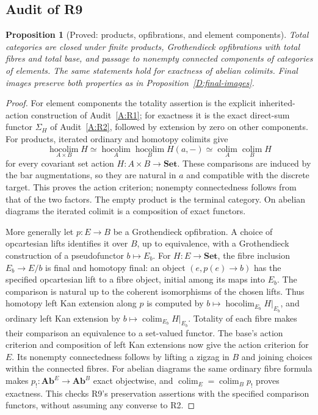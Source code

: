 \documentclass[11pt,a4paper]{article}
\newcommand{\Set}{\mathbf{Set}}
\newcommand{\Ab}{\mathbf{Ab}}
\newcommand{\colim}{\operatorname*{colim}}
\newcommand{\hocolim}{\operatorname*{hocolim}}
\newtheorem{proposition}[theorem]{Proposition}
\theoremstyle{definition}
\begin{document}
\subsection{Audit of R9}
\begin{proposition}[Proved: products, opfibrations, and element components]\label{D:R9}
Total categories are closed under finite products, Grothendieck opfibrations with total fibres and total base, and passage to nonempty connected components of categories of elements. The same statements hold for exactness of abelian colimits. Final images preserve both properties as in Proposition~\ref{D:final-images}.
\end{proposition}
\begin{proof}
For element components the totality assertion is the explicit inherited-action construction of Audit~\ref{A:R1}; for exactness it is the exact direct-sum functor $\Sigma_H$ of Audit~\ref{A:R2}, followed by extension by zero on other components. For products, iterated ordinary and homotopy colimits give
\[
 \hocolim_{A\times B}H\simeq
 \hocolim_A\hocolim_BH(a,-)\simeq
 \colim_A\colim_BH
\]
for every covariant set action $H:A\times B\to\Set$. These comparisons are induced by the bar augmentations, so they are natural in $a$ and compatible with the discrete target. This proves the action criterion; nonempty connectedness follows from that of the two factors. The empty product is the terminal category. On abelian diagrams the iterated colimit is a composition of exact functors.

More generally let $p:E\to B$ be a Grothendieck opfibration. A choice of opcartesian lifts identifies it over $B$, up to equivalence, with a Grothendieck construction of a pseudofunctor $b\mapsto E_b$. For $H:E\to\Set$, the fibre inclusion $E_b\to E/b$ is final and homotopy final: an object $(e,p(e)\to b)$ has the specified opcartesian lift to a fibre object, initial among its maps into $E_b$. The comparison is natural up to the coherent isomorphisms of the chosen lifts. Thus homotopy left Kan extension along $p$ is computed by $b\mapsto\hocolim_{E_b}H|_{E_b}$, and ordinary left Kan extension by $b\mapsto\colim_{E_b}H|_{E_b}$. Totality of each fibre makes their comparison an equivalence to a set-valued functor. The base's action criterion and composition of left Kan extensions now give the action criterion for $E$. Its nonempty connectedness follows by lifting a zigzag in $B$ and joining choices within the connected fibres. For abelian diagrams the same ordinary fibre formula makes $p_!:\Ab^E\to\Ab^B$ exact objectwise, and $\colim_E=\colim_Bp_!$ proves exactness. This checks R9's preservation assertions with the specified comparison functors, without assuming any converse to R2.
\end{proof}
\end{document}
